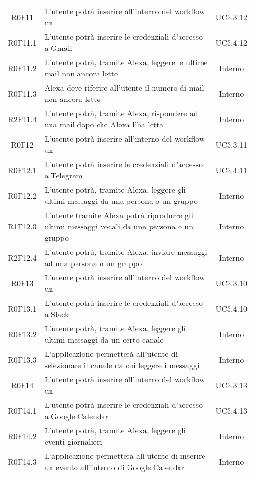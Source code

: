 \begin{center}
\begin{longtable}{cm{8cm}c }
	R0F11 & L'utente potrà inserire all'interno del workflow un \BMail{} & UC3.3.12 \\
	R0F11.1 & L'utente potrà inserire le credenziali d'accesso a Gmail & UC3.4.12 \\
	R0F11.2 & L'utente potrà, tramite Alexa, leggere le ultime mail non ancora lette & Interno \\
	R0F11.3 & Alexa deve riferire all'utente il numero di mail non ancora lette & Interno \\
	R2F11.4 & L'utente potrà, tramite Alexa, rispondere ad una mail dopo che Alexa l'ha letta & Interno \\
	R0F12 & L'utente potrà inserire all'interno del workflow un \BTelegram{} & UC3.3.11 \\
	R0F12.1 & L'utente potrà inserire le credenziali d'accesso a Telegram & UC3.4.11 \\
	R0F12.2 & L'utente potrà, tramite Alexa, leggere gli ultimi messaggi da una persona o un gruppo & Interno \\
	R1F12.3 & L'utente tramite Alexa potrà riprodurre gli ultimi messaggi vocali da una persona o un gruppo & Interno \\
	R2F12.4 & L'utente potrà, tramite Alexa, inviare messaggi ad una persona o un gruppo  & Interno \\
	R0F13 & L'utente potrà inserire all'interno del workflow un \BSlack{} & UC3.3.10 \\
	R0F13.1 & L'utente potrà inserire le credenziali d'accesso a Slack & UC3.4.10 \\
	R0F13.2 & L'utente potrà, tramite Alexa, leggere gli ultimi messaggi da un certo canale & Interno \\
	R0F13.3 & L'applicazione permetterà all'utente di selezionare il canale da cui leggere i messaggi & Interno \\
	R0F14 & L'utente potrà inserire all'interno del workflow un \BCalendario{} & UC3.3.13 \\
	R0F14.1 & L'utente potrà inserire le credenziali d'accesso a Google Calendar & UC3.4.13 \\
	R0F14.2 & L'utente potrà, tramite Alexa, leggere gli eventi giornalieri & Interno \\
	R0F14.3 & L'applicazione permetterà all'utente di inserire un evento all'interno di Google Calendar & Interno \\

\end{longtable}
\end{center}
